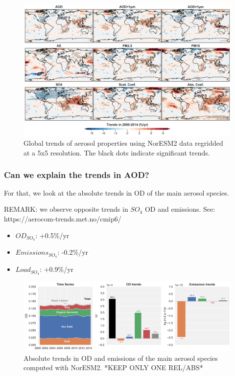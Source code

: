 \documentclass[journal abbreviation, manuscript]{copernicus}
\begin{document}
\begin{figure}[t]
 \includegraphics[width=16cm]{../scripts/figs/trends_map.png}
 \caption{Global trends of aerosol properties using NorESM2 data regridded at a 5x5 resolution. The black dots indicate significant trends.}
 \label{mod_map_trends}
\end{figure}

\subsubsection{Can we explain the trends in AOD?}

For that,  we look at the absolute trends in OD of the main aerosol species.

REMARK: we observe opposite trends in $SO_{4}$ OD and emissions.
See: https://aerocom-trends.met.no/cmip6/
\begin{itemize}
    \item $OD_{SO_{4}}$: +0.5\%/yr
    \item $Emissions_{SO_{4}}$: -0.2\%/yr
    \item $Load_{SO_{4}}$: +0.9\%/yr
\end{itemize}


\begin{figure}[t]
 \includegraphics[width=16cm]{../scripts/figs/abs_species_trends.png}
 \caption{Absolute trends in OD and emissions of the main aerosol species computed with NorESM2. *KEEP ONLY ONE REL/ABS*}
 \label{species_abs_trends}
\end{figure}
\end{document}
